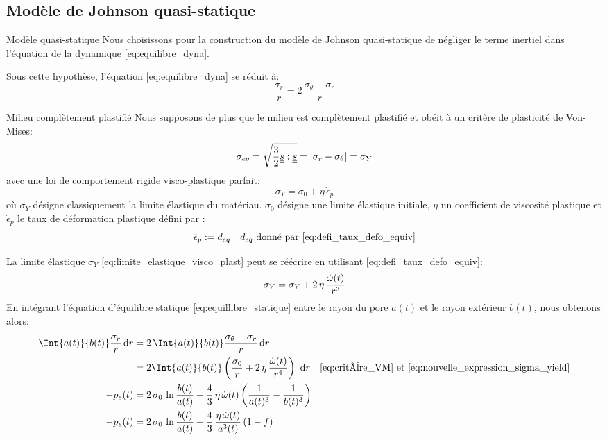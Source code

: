 \documentclass[10pt]{book}
\begin{document}
\subsection{Modèle de Johnson quasi-statique}
\begin{Hypothese}{Modèle quasi-statique} Nous choisissons pour la construction du modèle de Johnson quasi-statique de négliger le terme inertiel dans l'équation de la dynamique \eqref{eq:equilibre_dyna}.
\end{Hypothese}
Sous cette hypothèse, l'équation \eqref{eq:equilibre_dyna} se réduit à:
\begin{equation}
\dfrac{\sigma_r}{r} = 2 \,\dfrac{\sigma_\theta-\sigma_r}{r}
\label{eq:equillibre_statique}
\end{equation}
\begin{Hypothese}{Milieu complètement plastifié} Nous supposons de plus que le milieu est complètement plastifié et obéit à un critère de plasticité de Von-Mises:
\begin{equation}
\sigma_{eq} = \sqrt{\dfrac{3}{2}\underline{\underline{s}}:\underline{\underline{s}}}=|\sigma_r-\sigma_\theta| = \sigma_Y
\label{eq:critère_VM}
\end{equation}
avec une loi de comportement rigide visco-plastique parfait:
\begin{equation}
\sigma_Y = \sigma_0 +\eta \,\dot{\epsilon}_p
\label{eq:limite_elastique_visco_plast}
\end{equation}
où $\sigma_{Y}$ désigne classiquement la limite élastique du matériau. $\sigma_{0}$ désigne une limite élastique initiale, $\eta$ un coefficient de viscosité plastique et $\dot{\epsilon}_p$ le taux de déformation plastique défini par : 
 $$\dot{\epsilon}_p:=d_{eq} \quad d_{eq} \text{ donné par \eqref{eq:defi_taux_defo_equiv}}$$
\end{Hypothese}
La limite élastique $\sigma_{Y}$ \eqref{eq:limite_elastique_visco_plast} peut se réécrire en utilisant \eqref{eq:defi_taux_defo_equiv}:
\begin{equation}
\sigma_Y = \sigma_{Y} + 2\,\eta\,\dfrac{\dot{\omega}(t)}{r^3}
\label{eq:nouvelle_expression_sigma_yield}
\end{equation}
En intégrant l'équation d'équilibre statique \eqref{eq:equillibre_statique} entre le rayon du pore $a(t)$ et le rayon extérieur $b(t)$, nous obtenons alors:
\begin{align}\nonumber
\Int{a(t)}{b(t)} \dfrac{\sigma_r}{r} \dr & = 2 \, \Int{a(t)}{b(t)}\dfrac{\sigma_\theta-\sigma_r}{r} \dr\\ &= 2\Int{a(t)}{b(t)}\pa{\dfrac{\sigma_0}{r}+   2\, \eta \,\dfrac{\dot{\omega}(t)}{r^4} }\, \dr \quad \eqref{eq:critère_VM} \et \eqref{eq:nouvelle_expression_sigma_yield}\\\nonumber
-p_e(t) & = 2 \,\sigma_0 \,\ln{\dfrac{b(t)}{a(t)}} +\dfrac{4}{3}\,\eta\,\dot{\omega}(t)\pa{\dfrac{1}{a(t)^3}-\dfrac{1}{b(t)^3}}\\\label{eq:porosite_avant_simpli}
-p_e(t) & = 2 \,\sigma_0 \,\ln{\dfrac{b(t)}{a(t)}} +\dfrac{4}{3}\,\dfrac{\eta\,\dot{\omega}(t)}{a^{3}(t)}\pa{1-f}
\end{align}
\end{document}
